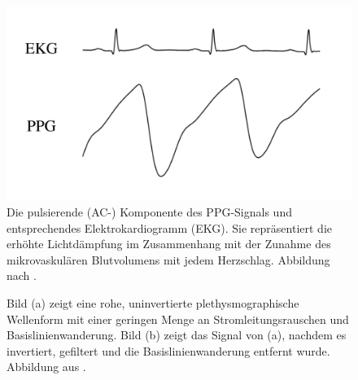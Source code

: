 \documentclass[10pt,a4paper,headinclude,twoside, plainheadsepline, open=right, numbers=noenddot, twocolumn]{article}
\begin{document}
\begin{figure}
	\centering
	\includegraphics[width=\linewidth]{images/ekgundppg.pdf}
	\caption{Die pulsierende (AC-) Komponente des PPG-Signals und entsprechendes Elektrokardiogramm
(EKG). Sie repräsentiert die erhöhte Lichtdämpfung im Zusammenhang mit der Zunahme des mikrovaskulären Blutvolumens mit jedem Herzschlag. Abbildung nach \cite{john2007photopletysmography}.}
	\label{ekg}
\end{figure}


\begin{figure}[ht]
	\centering
  \qquad
	\caption{Bild (a) zeigt eine rohe, uninvertierte plethysmographische Wellenform mit einer geringen Menge an Stromleitungsrauschen und Basislinienwanderung. Bild (b) zeigt das Signal von (a), nachdem es invertiert, gefiltert und die Basislinienwanderung entfernt wurde. Abbildung aus \cite{mcpherson2015systems}.}
	\label{verarbeitung}
\end{figure}
\end{document}
